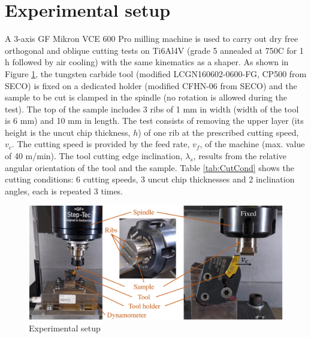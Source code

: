 \documentclass[preprint,12pt,times]{elsarticle}
\begin{document}
\section{Experimental setup}
\label{ExpSet}

A 3-axis GF Mikron VCE 600 Pro milling machine is used to carry out dry free orthogonal and oblique cutting tests on Ti6Al4V (grade 5 annealed at 750\textdegree{}C for 1 h followed by air cooling) with the same kinematics as a shaper. As shown in Figure \ref{ExpSetup}, the tungsten carbide tool (modified LCGN160602-0600-FG, CP500 from SECO) is fixed on a dedicated holder (modified CFHN-06 from SECO) and the sample to be cut is clamped in the spindle (no rotation is allowed during the test). The top of the sample includes 3 ribs of 1 mm in width (width of the tool is 6 mm) and 10 mm in length. The test consists of removing the upper layer (its height is the uncut chip thickness, $h$) of one rib at the prescribed cutting speed, $v_c$. The cutting speed is provided by the feed rate, $v_f$, of the machine (max. value of 40 m/min). The tool cutting edge inclination, $\lambda_s$, results from the relative angular orientation of the tool and the sample. Table \ref{tab:CutCond} shows the cutting conditions: 6 cutting speeds, 3 uncut chip thicknesses and 2 inclination angles, each is repeated 3 times.

\begin{figure}[h]
\centering
\includegraphics[width = 140 mm]{Figures/ExpSetup} %
\caption{Experimental setup}
\label{ExpSetup}
\end{figure}
\end{document}
